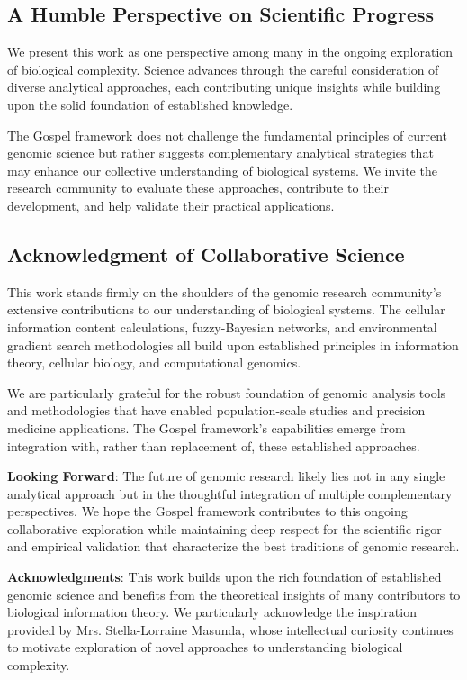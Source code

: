 \documentclass[12pt,a4paper]{article}
\begin{document}
\subsection{A Humble Perspective on Scientific Progress}

We present this work as one perspective among many in the ongoing exploration of biological complexity. Science advances through the careful consideration of diverse analytical approaches, each contributing unique insights while building upon the solid foundation of established knowledge.

The Gospel framework does not challenge the fundamental principles of current genomic science but rather suggests complementary analytical strategies that may enhance our collective understanding of biological systems. We invite the research community to evaluate these approaches, contribute to their development, and help validate their practical applications.

\subsection{Acknowledgment of Collaborative Science}

This work stands firmly on the shoulders of the genomic research community's extensive contributions to our understanding of biological systems. The cellular information content calculations, fuzzy-Bayesian networks, and environmental gradient search methodologies all build upon established principles in information theory, cellular biology, and computational genomics.

We are particularly grateful for the robust foundation of genomic analysis tools and methodologies that have enabled population-scale studies and precision medicine applications. The Gospel framework's capabilities emerge from integration with, rather than replacement of, these established approaches.

\textbf{Looking Forward}: The future of genomic research likely lies not in any single analytical approach but in the thoughtful integration of multiple complementary perspectives. We hope the Gospel framework contributes to this ongoing collaborative exploration while maintaining deep respect for the scientific rigor and empirical validation that characterize the best traditions of genomic research.

\textbf{Acknowledgments}: This work builds upon the rich foundation of established genomic science and benefits from the theoretical insights of many contributors to biological information theory. We particularly acknowledge the inspiration provided by Mrs. Stella-Lorraine Masunda, whose intellectual curiosity continues to motivate exploration of novel approaches to understanding biological complexity.
\end{document}
